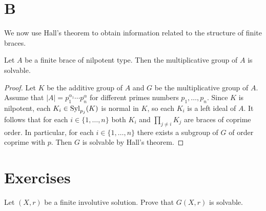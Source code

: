 \section*{B}

We now use Hall's theorem to obtain information related to the
structure of finite braces. 

\begin{theorem}
\label{thm:add_nilpotent}
Let $A$ be a finite brace of nilpotent type. Then 
the multiplicative group of $A$ is solvable.
\end{theorem}

\begin{proof}
    Let $K$ be the additive group of $A$ and $G$ be the multiplicative group of $A$. Assume
    that $|A|=p_1^{\alpha_1}\cdots p_n^{\alpha}$ for different primes numbers $p_1,\dots,p_n$. 
    Since $K$ is nilpotent, each $K_i\in\mathrm{Syl}_{p_j}(K)$ is normal in $K$, so 
    each $K_i$ is a left ideal of $A$. It follows that for each $i\in\{1,\dots,n\}$ both $K_i$ and 
    $\prod_{j\ne i}K_j$ are braces of coprime order. In particular, for 
    each $i\in\{1,\dots,n\}$ there exists a subgroup of $G$ of order coprime with $p$. 
    Then $G$ is solvable by Hall's theorem. 
\end{proof}






\section*{Exercises}

\begin{prob}
\label{prob:G(X,r)solvable}
Let $(X,r)$ be a finite involutive solution. Prove that $G(X,r)$ is solvable. 
\end{prob}

